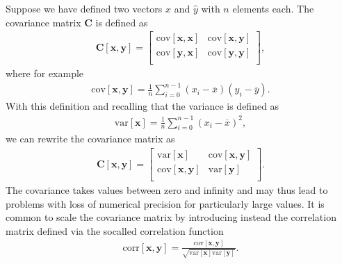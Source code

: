\documentclass[letterpaper,10pt,english]{sphinxmanual}
\begin{document}
Suppose we have defined two vectors
\(\hat{x}\) and \(\hat{y}\) with \(n\) elements each. The covariance matrix \(\boldsymbol{C}\) is defined as
\begin{equation*}
\begin{split}
\boldsymbol{C}[\boldsymbol{x},\boldsymbol{y}] = \begin{bmatrix} \mathrm{cov}[\boldsymbol{x},\boldsymbol{x}] & \mathrm{cov}[\boldsymbol{x},\boldsymbol{y}] \\
                              \mathrm{cov}[\boldsymbol{y},\boldsymbol{x}] & \mathrm{cov}[\boldsymbol{y},\boldsymbol{y}] \\
             \end{bmatrix},
\end{split}
\end{equation*}
where for example
\begin{equation*}
\begin{split}
\mathrm{cov}[\boldsymbol{x},\boldsymbol{y}] =\frac{1}{n} \sum_{i=0}^{n-1}(x_i- \overline{x})(y_i- \overline{y}).
\end{split}
\end{equation*}
With this definition and recalling that the variance is defined as
\begin{equation*}
\begin{split}
\mathrm{var}[\boldsymbol{x}]=\frac{1}{n} \sum_{i=0}^{n-1}(x_i- \overline{x})^2,
\end{split}
\end{equation*}
we can rewrite the covariance matrix as
\begin{equation*}
\begin{split}
\boldsymbol{C}[\boldsymbol{x},\boldsymbol{y}] = \begin{bmatrix} \mathrm{var}[\boldsymbol{x}] & \mathrm{cov}[\boldsymbol{x},\boldsymbol{y}] \\
                              \mathrm{cov}[\boldsymbol{x},\boldsymbol{y}] & \mathrm{var}[\boldsymbol{y}] \\
             \end{bmatrix}.
\end{split}
\end{equation*}
The covariance takes values between zero and infinity and may thus
lead to problems with loss of numerical precision for particularly
large values. It is common to scale the covariance matrix by
introducing instead the correlation matrix defined via the so\sphinxhyphen{}called
correlation function
\begin{equation*}
\begin{split}
\mathrm{corr}[\boldsymbol{x},\boldsymbol{y}]=\frac{\mathrm{cov}[\boldsymbol{x},\boldsymbol{y}]}{\sqrt{\mathrm{var}[\boldsymbol{x}] \mathrm{var}[\boldsymbol{y}]}}.
\end{split}
\end{equation*}
\end{document}
